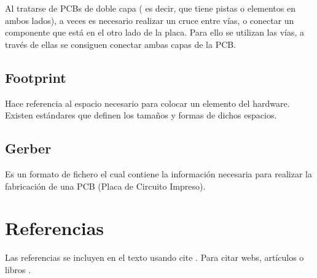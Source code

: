 Al tratarse de PCBs de doble capa ( es decir, que tiene pistas o elementos en ambos lados), a veces es necesario realizar un cruce entre vías, o conectar un componente que está en el otro lado de la placa. Para ello se utilizan las vías, a través de ellas se consiguen conectar ambas capas de la PCB.


\subsection{Footprint}\label{footprint}

Hace referencia al espacio necesario para colocar un elemento del hardware. Existen estándares que definen los tamaños y formas de dichos espacios.


\subsection{Gerber}\label{gerber}
Es un formato de fichero el cual contiene la información necesaria para realizar la fabricación de una PCB (Placa de Circuito Impreso).



\section{Referencias}

Las referencias se incluyen en el texto usando cite \cite{wiki:latex}. Para citar webs, artículos o libros \cite{koza92}.



